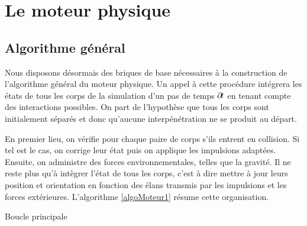 \section{Le moteur physique}

\subsection{Algorithme général}

Nous disposons désormais des briques de base nécessaires à la
construction de l'algorithme général du moteur physique. Un appel à
cette procédure intégrera les états de tous les corps de la simulation
d'un pas de temps $\partial \! t$ en tenant compte des interactions
possibles. On part de l'hypothèse que tous les corps sont initialement
séparés et donc qu'aucune interpénétration ne se produit au départ.

En premier lieu, on vérifie pour chaque paire de corps s'ils entrent
en collision. Si tel est le cas, on corrige leur état puis on applique
les impulsions adaptées. Ensuite, on administre des forces
environnementales, telles que la gravité. Il ne reste plus qu'à
intègrer l'état de tous les corps, c'est à dire mettre à jour leurs
position et orientation en fonction des élans transmis par les
impulsions et les forces extérieures. L'algorithme \ref{algoMoteur1}
résume cette organisation.

\begin{algorithm}[h]
  \caption{Boucle principale}
  \label{algoMoteur1}
  \dontprintsemicolon
  \BlankLine
  \BlankLine
  \BlankLine
\end{algorithm}


